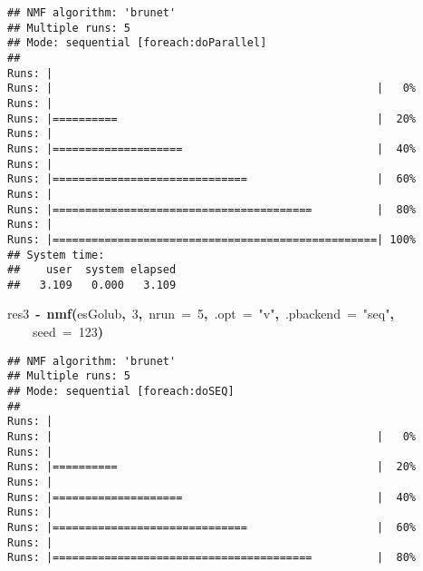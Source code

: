 \documentclass[a4paper]{article}\usepackage{graphicx, color}
\makeatletter
\newcommand{\hlnumber}[1]{\textcolor[rgb]{0,0,0}{#1}}%
\newcommand{\hlfunctioncall}[1]{\textcolor[rgb]{0.501960784313725,0,0.329411764705882}{\textbf{#1}}}%
\newcommand{\hlstring}[1]{\textcolor[rgb]{0.6,0.6,1}{#1}}%
\newcommand{\hlkeyword}[1]{\textcolor[rgb]{0,0,0}{\textbf{#1}}}%
\newcommand{\hlargument}[1]{\textcolor[rgb]{0.690196078431373,0.250980392156863,0.0196078431372549}{#1}}%
\newcommand{\hlassignement}[1]{\textcolor[rgb]{0,0,0}{\textbf{#1}}}%
\newcommand{\hlsymbol}[1]{\textcolor[rgb]{0,0,0}{#1}}%
\newcommand{\hlstd}[1]{\textcolor[rgb]{0,0,0}{#1}}%
\newenvironment{kframe}{%
 \def\FrameCommand##1{\hskip\@totalleftmargin \hskip-\fboxsep
 \colorbox{shadecolor}{##1}\hskip-\fboxsep
     \hskip-\linewidth \hskip-\@totalleftmargin \hskip\columnwidth}%
 \MakeFramed {\advance\hsize-\width
   \@totalleftmargin\z@ \linewidth\hsize
   \@setminipage}}%
 {\par\unskip\endMakeFramed}
\newenvironment{knitrout}{}{} %
\makeatother
\begin{document}
\begin{knitrout}
\begin{kframe}
\begin{flushleft}
\normalfont
\end{flushleft}
\begin{verbatim}
## NMF algorithm: 'brunet'
## Multiple runs: 5
## Mode: sequential [foreach:doParallel]
## 
Runs: |                                                        
Runs: |                                                  |   0%
Runs: |                                                        
Runs: |==========                                        |  20%
Runs: |                                                        
Runs: |====================                              |  40%
Runs: |                                                        
Runs: |==============================                    |  60%
Runs: |                                                        
Runs: |========================================          |  80%
Runs: |                                                        
Runs: |==================================================| 100%
## System time:
##    user  system elapsed 
##   3.109   0.000   3.109 
\end{verbatim}
\begin{flushleft}
\ttfamily\noindent
\hlsymbol{res3}{\ }\hlassignement{\usebox{\hlnormalsizeboxlessthan}-}{\ }\hlfunctioncall{nmf}\hlkeyword{(}\hlsymbol{esGolub}\hlkeyword{,}{\ }\hlnumber{3}\hlkeyword{,}{\ }\hlargument{nrun}{\ }\hlargument{=}{\ }\hlnumber{5}\hlkeyword{,}{\ }\hlargument{.opt}{\ }\hlargument{=}{\ }\hlstring{"{}v"{}}\hlkeyword{,}{\ }\hlargument{.pbackend}{\ }\hlargument{=}{\ }\hlstring{"{}seq"{}}\hlkeyword{,}\hspace*{\fill}\\
\hlstd{}{\ }{\ }{\ }{\ }\hlargument{seed}{\ }\hlargument{=}{\ }\hlnumber{123}\hlkeyword{)}\mbox{}
\normalfont
\end{flushleft}
\begin{verbatim}
## NMF algorithm: 'brunet'
## Multiple runs: 5
## Mode: sequential [foreach:doSEQ]
## 
Runs: |                                                        
Runs: |                                                  |   0%
Runs: |                                                        
Runs: |==========                                        |  20%
Runs: |                                                        
Runs: |====================                              |  40%
Runs: |                                                        
Runs: |==============================                    |  60%
Runs: |                                                        
Runs: |========================================          |  80%

\end{verbatim}
\end{kframe}
\end{knitrout}
\end{document}
